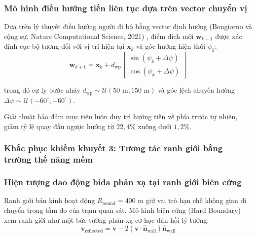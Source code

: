 \subsubsection{Mô hình điều hướng tiến liên tục dựa trên vector chuyển vị}

\hspace{0.5cm} Dựa trên lý thuyết điều hướng người đi bộ bằng vector định hướng (Bongiorno và cộng sự, Nature Computational Science, 2021) \cite{bongiorno2021vector}, điểm đích mới $\mathbf{w}_{k+1}$ được xác định cục bộ tương đối với vị trí hiện tại $\mathbf{x}_k$ và góc hướng hiện thời $\psi_k$:
\begin{equation}
\mathbf{w}_{k+1} = \mathbf{x}_k + d_{\text{wp}} \begin{bmatrix} \sin(\psi_k + \Delta\psi) \\ \cos(\psi_k + \Delta\psi) \end{bmatrix}
\label{eq:relative-forward-waypoint}
\end{equation}

trong đó cự ly bước nhảy $d_{\text{wp}} \sim \mathcal{U}(50\text{ m}, 150\text{ m})$ và góc lệch chuyển hướng $\Delta\psi \sim \mathcal{U}(-60^\circ, +60^\circ)$.

Giải thuật bảo đảm mục tiêu luôn duy trì hướng tiến về phía trước tự nhiên, giảm tỷ lệ quay đầu ngược hướng từ $22{,}4\%$ xuống dưới $1{,}2\%$.

\subsubsection{Khắc phục khiếm khuyết 3: Tương tác ranh giới bằng trường thế năng mềm}

\subsubsection{Hiện tượng dao động bida phản xạ tại ranh giới biên cứng}

\hspace{0.5cm} Ranh giới bán kính hoạt động $R_{\text{bound}} = 400$ m giữ vai trò hạn chế không gian di chuyển trong tầm đo của trạm quan sát. Mô hình biên cứng (Hard Boundary) xem ranh giới như một bức tường phản xạ cơ học đàn hồi lý tưởng:
\begin{equation}
\mathbf{v}_{\text{reflected}} = \mathbf{v} - 2(\mathbf{v} \cdot \hat{\mathbf{n}}_{\text{wall}}) \hat{\mathbf{n}}_{\text{wall}}
\label{eq:specular-reflection-law}
\end{equation}

